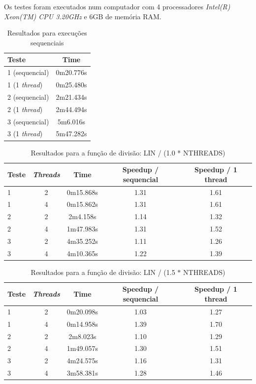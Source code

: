 \documentclass[12pt]{article}
\begin{document}
Os testes foram executados num computador com 4 processadores \textit{Intel(R) Xeon(TM) CPU 3.20GHz} e 6GB de
memória RAM.

\begin{table}[H]
    \begin{tabular}{ | l | c |}
      \hline
      \textbf{Teste} & \textbf{Time} \\ \hline
      1 (sequencial) & 0m20.776s \\ \hline
      1 (1 \textit{thread}) & 0m25.480s \\ \hline
      2 (sequencial) & 2m21.434s \\ \hline
      2 (1 \textit{thread}) & 2m44.494s \\ \hline
      3 (sequencial) & 5m6.016s \\ \hline
      3 (1 \textit{thread}) & 5m47.282s \\ \hline
  \end{tabular}
  \caption{Resultados para execuções sequenciais}
  \label{tbl:resultados_seq}
\end{table}

\begin{table}[H]
    \begin{tabular}{ | l | c | c | c | c |}
      \hline
      \textbf{Teste} & \textbf{\textit{Threads}} & \textbf{Time} & \textbf{Speedup / sequencial} & \textbf{Speedup / 1 thread}\\ \hline
      1 & 2 & 0m15.868s & 1.31 & 1.61 \\ \hline
      1 & 4 & 0m15.862s & 1.31 & 1.61 \\ \hline
      2 & 2 & 2m4.158s & 1.14 & 1.32 \\ \hline
      2 & 4 & 1m47.983s & 1.31 & 1.52 \\ \hline
      3 & 2 & 4m35.252s & 1.11 & 1.26 \\ \hline
      3 & 4 & 4m10.365s & 1.22 & 1.39 \\ \hline
  \end{tabular}
  \caption{Resultados para a função de divisão: LIN / (1.0 * NTHREADS)}
  \label{tbl:resultados1}
\end{table}

\begin{table}[H]
    \begin{tabular}{ | l | c | c | c | c |}
      \hline
      \textbf{Teste} & \textbf{\textit{Threads}} & \textbf{Time} & \textbf{Speedup / sequencial} & \textbf{Speedup / 1 thread}\\ \hline
      1 & 2 & 0m20.098s & 1.03 & 1.27 \\ \hline
      1 & 4 & 0m14.958s & 1.39 & 1.70 \\ \hline
      2 & 2 & 2m8.023s & 1.10 & 1.29 \\ \hline
      2 & 4 & 1m49.057s & 1.30 & 1.51 \\ \hline
      3 & 2 & 4m24.575s & 1.16 & 1.31 \\ \hline
      3 & 4 & 3m58.381s & 1.28 & 1.46 \\ \hline
  \end{tabular}
  \caption{Resultados para a função de divisão: LIN / (1.5 $*$ NTHREADS)}
  \label{tbl:resultados15}
\end{table}
\end{document}
